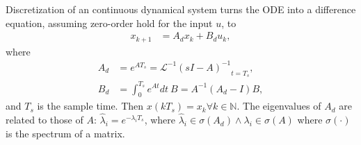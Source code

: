 \documentclass[runningheads,a4paper]{llncs}
\begin{document}
Discretization of an continuous dynamical system turns the ODE into a difference equation, assuming zero-order hold
for the input $u$, 
to
\begin{align}
\label{eq:discretization}
x_{k+1} &= A_d x_k+B_d u_k,
\end{align}
where
\begin{align}
\label{eq:discretize}
A_d &= e^{A T_s} = \mathcal{L}^{-1} { ( s I - A )^{-1} }_{t = T_s},\\
B_d &= \int_{0}^{T_s} e^{A t} dt\ B = A^{-1} ( A_d - I ) B,
\end{align}
and $T_s$ is the sample time. Then
$x(kT_s)=x_k 
\forall k \in \mathbb N$.
The eigenvalues of $A_d$ 
are related to those of $A$:  
$\hat{\lambda}_i=e^{-\lambda_iT_s}$, where $\hat{\lambda}_i \in \sigma(A_d) \wedge \lambda_i \in \sigma(A)$
where $\sigma(\cdot)$ is the spectrum of a matrix.

\end{document}
